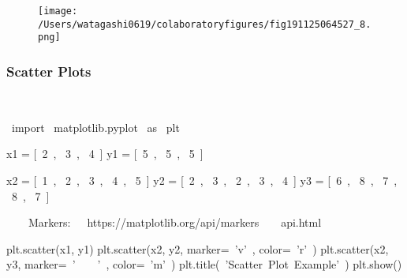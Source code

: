\begin{figure}[H]
\centering
\texttt{[image: /Users/watagashi0619/colaboratoryfigures/fig191125064527\_8.png]}
\end{figure}
\subsubsection{Scatter Plots}

\begin{paracol}{2}
\smallskip
\begin{cellExecute}[escapechar=~]
~~
\end{cellExecute}
\switchcolumn
\begin{codeCell}[escapechar=~]
~\textcolor{mtk17}{import}~ matplotlib.pyplot ~\textcolor{mtk17}{as}~ plt

x1 = [~\textcolor{mtk7}{2}~, ~\textcolor{mtk7}{3}~, ~\textcolor{mtk7}{4}~]
y1 = [~\textcolor{mtk7}{5}~, ~\textcolor{mtk7}{5}~, ~\textcolor{mtk7}{5}~]

x2 = [~\textcolor{mtk7}{1}~, ~\textcolor{mtk7}{2}~, ~\textcolor{mtk7}{3}~, ~\textcolor{mtk7}{4}~, ~\textcolor{mtk7}{5}~]
y2 = [~\textcolor{mtk7}{2}~, ~\textcolor{mtk7}{3}~, ~\textcolor{mtk7}{2}~, ~\textcolor{mtk7}{3}~, ~\textcolor{mtk7}{4}~]
y3 = [~\textcolor{mtk7}{6}~, ~\textcolor{mtk7}{8}~, ~\textcolor{mtk7}{7}~, ~\textcolor{mtk7}{8}~, ~\textcolor{mtk7}{7}~]

~~~\textcolor{mtk8}{ Markers: }~~\textcolor{mtk8}{https://matplotlib.org/api/markers}~~~~\textcolor{mtk8}{api.html}~

plt.scatter(x1, y1)
plt.scatter(x2, y2, marker=~\textcolor{mtk25}{'v'}~, color=~\textcolor{mtk25}{'r'}~)
plt.scatter(x2, y3, marker=~\textcolor{mtk25}{'}~~~~\textcolor{mtk25}{'}~, color=~\textcolor{mtk25}{'m'}~)
plt.title(~\textcolor{mtk25}{'Scatter Plot Example'}~)
plt.show()
\end{codeCell}
\end{paracol}

\begin{paracol}{2}
\begin{cellExecute}[escapechar=~]
~~
\end{cellExecute}
\switchcolumn
\begin{resultCell}[escapechar=~]
\end{resultCell}
\end{paracol}

